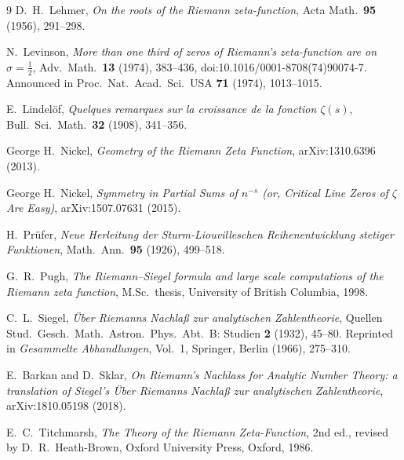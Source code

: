 \documentclass[11pt]{article}
\theoremstyle{definition}
\begin{document}
\begin{thebibliography}{9}
D.~H.\ Lehmer, \emph{On the roots of the Riemann zeta-function},
Acta Math.\ \textbf{95} (1956), 291--298.

N.~Levinson, \emph{More than one third of zeros of Riemann's zeta-function
are on $\sigma=\tfrac12$}, Adv.\ Math.\ \textbf{13} (1974), 383--436,
doi:10.1016/0001-8708(74)90074-7. Announced in Proc.\ Nat.\ Acad.\ Sci.\ USA
\textbf{71} (1974), 1013--1015.

E.~Lindel\"of, \emph{Quelques remarques sur la croissance de la fonction
$\zeta(s)$}, Bull.\ Sci.\ Math.\ \textbf{32} (1908), 341--356.

George H.\ Nickel, \emph{Geometry of the Riemann Zeta Function},
arXiv:1310.6396 (2013).

George H.\ Nickel, \emph{Symmetry in Partial Sums of $n^{-s}$ (or, Critical Line
Zeros of $\zeta$ Are Easy)}, arXiv:1507.07631 (2015).

H.~Pr\"ufer, \emph{Neue Herleitung der Sturm-Liouvilleschen
Reihenentwicklung stetiger Funktionen}, Math.\ Ann.\ \textbf{95} (1926),
499--518.

G.~R.\ Pugh, \emph{The Riemann--Siegel formula and large scale computations
of the Riemann zeta function}, M.Sc.\ thesis, University of British
Columbia, 1998.

C.~L.\ Siegel, \emph{\"Uber Riemanns Nachla\ss{} zur analytischen
Zahlentheorie}, Quellen Stud.\ Gesch.\ Math.\ Astron.\ Phys.\ Abt.\ B:
Studien \textbf{2} (1932), 45--80. Reprinted in \emph{Gesammelte
Abhandlungen}, Vol.~1, Springer, Berlin (1966), 275--310.

E.~Barkan and D.~Sklar, \emph{On Riemann's Nachlass for Analytic Number
Theory: a translation of Siegel's \"Uber Riemanns Nachla\ss{} zur
analytischen Zahlentheorie}, arXiv:1810.05198 (2018).

E.~C.\ Titchmarsh, \emph{The Theory of the Riemann Zeta-Function}, 2nd ed.,
revised by D.~R.\ Heath-Brown, Oxford University Press, Oxford, 1986.

\end{thebibliography}
\end{document}
